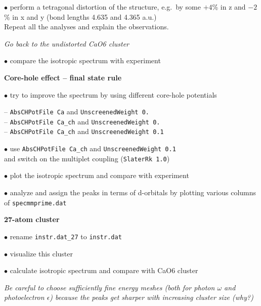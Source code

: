 \documentclass[landscape]{slides}
\begin{document}
\begin{slide}
$\bullet$ perform a tetragonal distortion of the structure, e.g.\ 
by some $+4$\% in z and $-2$\% in x and y (bond lengths 4.635 and 4.365 a.u.)\\
Repeat all the analyses and explain the observations.


{\it Go back to the undistorted CaO6 cluster}

$\bullet$ compare the isotropic spectrum with experiment


{\bf Core-hole effect -- final state rule}

$\bullet$ try to improve the spectrum by using 
different core-hole potentials

-- {\tt AbsCHPotFile  Ca} and {\tt UnscreenedWeight 0.}\\
-- {\tt AbsCHPotFile  Ca\_ch} and {\tt UnscreenedWeight 0.}\\
-- {\tt AbsCHPotFile  Ca\_ch} and {\tt UnscreenedWeight 0.1}


$\bullet$ use {\tt AbsCHPotFile  Ca\_ch} and {\tt UnscreenedWeight 0.1}\\
and switch on the multiplet coupling ({\tt SlaterRk 1.0})

$\bullet$ plot the isotropic spectrum and compare with experiment

$\bullet$ analyze and assign the peaks in terms of d-orbitals
by plotting various columns of {\tt specmmprime.dat}

{\bf 27-atom cluster}

$\bullet$  rename {\tt instr.dat\_27} to {\tt instr.dat} 

$\bullet$ visualize this cluster

$\bullet$ calculate isotropic spectrum and compare with CaO6 cluster

\begin{small}
{\it Be  careful to choose sufficiently fine energy meshes (both for photon $\omega$ and photoelectron $\epsilon$) because 
the peaks get sharper with increasing cluster size (why?)}
\end{small}

 


\end{slide}
\end{document}
